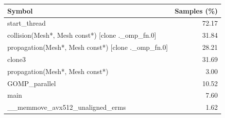 \begin{tabular}{@{}lr@{}}
\toprule
Symbol & Samples (\%) \\
\midrule
start\_thread & 72.17 \\
collision(Mesh*, Mesh const*) [clone .\_omp\_fn.0] & 31.84 \\
propagation(Mesh*, Mesh const*) [clone .\_omp\_fn.0] & 28.21 \\
clone3 & 31.69 \\
propagation(Mesh*, Mesh const*) & 3.00 \\
GOMP\_parallel & 10.52 \\
main & 7.60 \\
\_\_memmove\_avx512\_unaligned\_erms & 1.62 \\
\bottomrule
\end{tabular}
